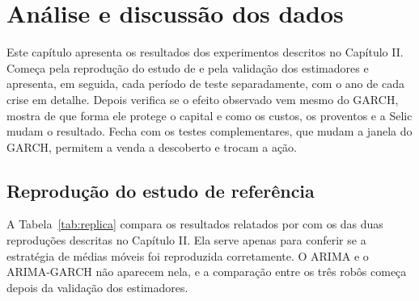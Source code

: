 \chapter{Análise e discussão dos dados}

Este capítulo apresenta os resultados dos experimentos descritos no Capítulo II.
Começa pela reprodução do estudo de  e pela validação dos
estimadores e apresenta, em seguida, cada período de teste separadamente, com o ano de cada crise em
detalhe. Depois verifica se o efeito
observado vem mesmo do GARCH, mostra de que forma ele protege o capital e como os
custos, os proventos e a Selic mudam o resultado. Fecha com os testes
complementares, que mudam a janela do GARCH, permitem a venda a descoberto e
trocam a ação.

\section{Reprodução do estudo de referência}

A Tabela~\ref{tab:replica} compara os resultados relatados por
 com os das duas reproduções descritas no Capítulo II.
Ela serve apenas para conferir se a estratégia de médias móveis foi reproduzida
corretamente. O ARIMA e o ARIMA-GARCH não aparecem nela, e a comparação entre os
três robôs começa depois da validação dos estimadores.

